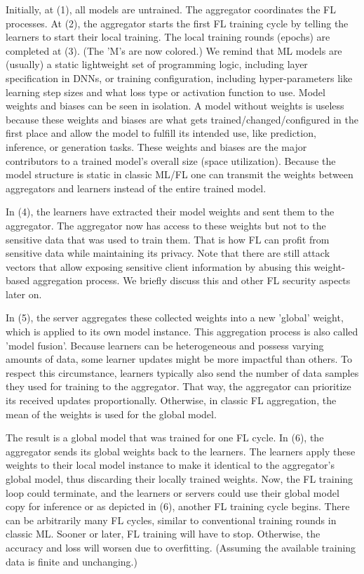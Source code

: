 Initially, at (1), all models are untrained.
The aggregator coordinates the FL processes.
At (2), the aggregator starts the first FL training cycle by telling the learners
to start their local training.
The local training rounds (epochs) are completed at (3).
(The 'M's are now colored.)
We remind that ML models are (usually) a static lightweight set of
programming logic, including layer specification in DNNs, or training configuration,
including hyper-parameters like learning step sizes and what loss type or
activation function to use.
Model weights and biases can be seen in isolation.
A model without weights is useless because these weights and biases
are what gets trained/changed/configured in the first place and allow
the model to fulfill its intended use, like prediction, inference, or generation tasks.
These weights and biases are the major contributors to
a trained model's overall size (space utilization).
Because the model structure is static in classic ML/FL
one can transmit the weights between aggregators and learners
instead of the entire trained model.

In (4), the learners have extracted their model weights and sent them to the aggregator.
The aggregator now has access to these weights but not
to the sensitive data that was used to train them.
That is how FL can profit from sensitive data while maintaining its privacy.
Note that there are still attack vectors that allow exposing sensitive client information
by abusing this weight-based aggregation process.
We briefly discuss this and other FL security aspects later on.

In (5), the server aggregates these collected weights into
a new 'global' weight, which is applied to its own model instance.
This aggregation process is also called 'model fusion'.
Because learners can be heterogeneous and possess varying amounts of data,
some learner updates might be more impactful than others.
To respect this circumstance, learners typically also send the number
of data samples they used for training to the aggregator.
That way, the aggregator can prioritize its received updates proportionally.
Otherwise, in classic FL aggregation, the mean of the weights is used for the global model.

The result is a global model that was trained for one FL cycle.
In (6), the aggregator sends its global weights back to the learners.
The learners apply these weights to their local model instance
to make it identical to the aggregator's global model,
thus discarding their locally trained weights.
Now, the FL training loop could terminate, and the learners or servers
could use their global model copy for inference or
as depicted in (6), another FL training cycle begins.
There can be arbitrarily many FL cycles, similar to conventional training rounds
in classic ML. Sooner or later, FL training will have to stop.
Otherwise, the accuracy and loss will worsen due to overfitting.
(Assuming the available training data is finite and unchanging.)
